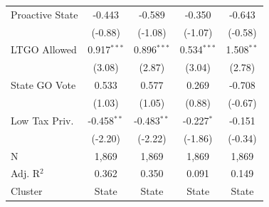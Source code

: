 \begin{tabular*}{\textwidth}{@{\extracolsep{\fill}}lcccc}
   Proactive State      & -0.443                    & -0.589                        & -0.350                               & -0.643\\   
                        & (-0.88)                  & (-1.08)                      & (-1.07)                             & (-0.58)\\   
   LTGO Allowed         & 0.917$^{***}$             & 0.896$^{***}$                 & 0.534$^{***}$                        & 1.508$^{**}$\\   
                        & (3.08)                   & (2.87)                       & (3.04)                              & (2.78)\\   
   State GO Vote        & 0.533                     & 0.577                         & 0.269                                & -0.708\\   
                        & (1.03)                   & (1.05)                       & (0.88)                              & (-0.67)\\   
   Low Tax Priv.        & -0.458$^{**}$             & -0.483$^{**}$                 & -0.227$^{*}$                         & -0.151\\   
                        & (-2.20)                  & (-2.22)                      & (-1.86)                             & (-0.34)\\   
   \hline
   N         & 1,869                     & 1,869                         & 1,869                                & 1,869\\  
   Adj. R$^2$       & 0.362                     & 0.350                         & 0.091                                & 0.149\\  
   Cluster              & State & State & State & State\\  
   \bottomrule
\end{tabular*}
\par\endgroup
